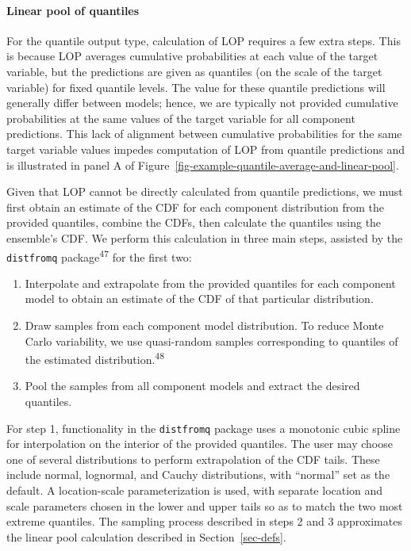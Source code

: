 \documentclass[
]{article}
\let\oldparagraph\paragraph
\renewcommand{\paragraph}[1]{\oldparagraph{#1}\mbox{}}
\providecommand{\tightlist}{%
  \setlength{\itemsep}{0pt}\setlength{\parskip}{0pt}}\usepackage{longtable,booktabs,array}
\begin{document}
\paragraph{Linear pool of quantiles}\label{linear-pool-of-quantiles}

For the quantile output type, calculation of LOP requires a few extra
steps. This is because LOP averages cumulative probabilities at each
value of the target variable, but the predictions are given as quantiles
(on the scale of the target variable) for fixed quantile levels. The
value for these quantile predictions will generally differ between
models; hence, we are typically not provided cumulative probabilities at
the same values of the target variable for all component predictions.
This lack of alignment between cumulative probabilities for the same
target variable values impedes computation of LOP from quantile
predictions and is illustrated in panel A of
Figure~\ref{fig-example-quantile-average-and-linear-pool}.

Given that LOP cannot be directly calculated from quantile predictions,
we must first obtain an estimate of the CDF for each component
distribution from the provided quantiles, combine the CDFs, then
calculate the quantiles using the ensemble's CDF. We perform this
calculation in three main steps, assisted by the \texttt{distfromq}
package\textsuperscript{47} for the first two:

\begin{enumerate}
\def\labelenumi{\arabic{enumi}.}
\tightlist
\item
  Interpolate and extrapolate from the provided quantiles for each
  component model to obtain an estimate of the CDF of that particular
  distribution.
\item
  Draw samples from each component model distribution. To reduce Monte
  Carlo variability, we use quasi-random samples corresponding to
  quantiles of the estimated distribution.\textsuperscript{48}
\item
  Pool the samples from all component models and extract the desired
  quantiles.
\end{enumerate}

For step 1, functionality in the \texttt{distfromq} package uses a
monotonic cubic spline for interpolation on the interior of the provided
quantiles. The user may choose one of several distributions to perform
extrapolation of the CDF tails. These include normal, lognormal, and
Cauchy distributions, with ``normal'' set as the default. A
location-scale parameterization is used, with separate location and
scale parameters chosen in the lower and upper tails so as to match the
two most extreme quantiles. The sampling process described in steps 2
and 3 approximates the linear pool calculation described in
Section~\ref{sec-defs}.
\end{document}
